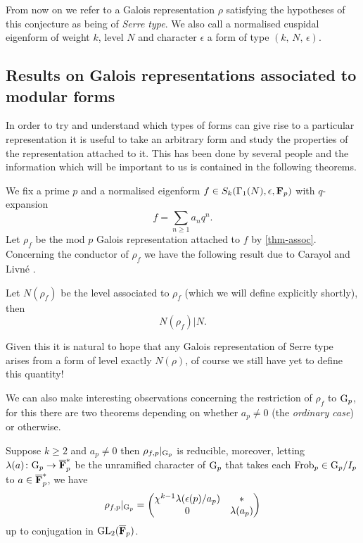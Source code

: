 \documentclass[a4paper,12pt]{article}
\begin{document}
From now on we refer to a Galois representation $\rho$ satisfying the hypotheses of this conjecture as being of \emph{Serre type}.
We also call a normalised cuspidal eigenform of weight $k$, level $N$ and character $\epsilon$ a form of type $(k,\,N,\,\epsilon)$. %

\subsection{Results on Galois representations associated to modular forms}
In order to try and understand which types of forms can give rise to a particular representation it is useful to take an arbitrary form and study the properties of the representation attached to it.
This has been done by several people and the information which will be important to us is contained in the following theorems. %

We fix a prime $p$ and a normalised eigenform $f \in S_k(\Gamma_1(N), \epsilon, \mathbf{F}_p)$ with $q$-expansion %
\[
f = \sum_{n\ge 1} a_nq^n.
\]
Let $\rho_f$ be the mod $p$ Galois representation attached to $f$ by \cref{thm-assoc}.
Concerning the conductor of $\rho_f$ we have the following result due to Carayol and Livn\'e \cite{Carayol, Livne}.

\begin{thm}
Let $N(\rho_f)$ be the level associated to $\rho_f$ (which we will define explicitly shortly), then
\[
N(\rho_f)|N.
\]
\end{thm}

Given this it is natural to hope that any Galois representation of Serre type arises from a form of level exactly $N(\rho)$, of course we still have yet to define this quantity!

We can also make interesting observations concerning the restriction of $\rho_f$ to $\mathrm{G}_p$, for this there are two theorems depending on whether $a_p \ne 0$ (the \emph{ordinary case}) or otherwise.

\begin{thm}[Deligne]
Suppose $k\ge 2$ and $a_p \ne 0$ then $\rho_{f,p}|_{\mathrm{G}_p}$ is reducible, moreover, letting $\lambda(a)\colon \mathrm{G}_p \to \overline{\mathbf{F}}_p^*$ be the unramified character of $\mathrm{G}_p$ that takes each $\operatorname{Frob}_p \in \mathrm{G}_p /I_p$ to $a\in\overline{\mathbf{F}}_p^*$, we have
\[
\rho_{f,p}|_{\mathrm{G}_p} = \begin{pmatrix} \chi^{k-1}\lambda(\epsilon(p)/a_p) & * \\ 0 & \lambda(a_p)\end{pmatrix}
\]
up to conjugation in $\operatorname{GL}_2(\overline{\mathbf{F}}_p)$.
\end{thm}
\end{document}
